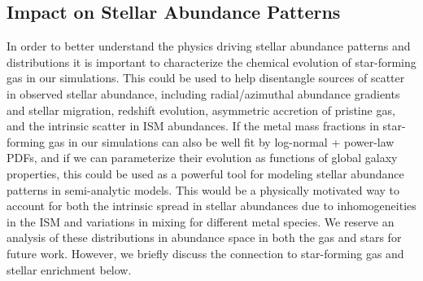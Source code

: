 \documentclass[twocolumn]{aastex61}
\begin{document}


\subsection{Impact on Stellar Abundance Patterns}
\label{sec:stellar abundances}
In order to better understand the physics driving stellar abundance patterns and distributions it is important to characterize the chemical evolution of star-forming gas in our simulations. This could be used to help disentangle sources of scatter in observed stellar abundance, including radial/azimuthal abundance gradients and stellar migration, redshift evolution, asymmetric accretion of pristine gas, and the intrinsic scatter in ISM abundances. If the 
        metal mass fractions in star-forming gas in our simulations 
        can also be well fit by log-normal + power-law PDFs,
and if we can parameterize their evolution as functions of global galaxy properties, this 
    could
be used as a powerful 
tool for modeling stellar abundance patterns in semi-analytic models. This would be a physically motivated way to account for both the intrinsic spread in stellar abundances due to inhomogeneities in the ISM and variations in mixing for different metal species. We reserve an analysis of these distributions in abundance space in both the gas and stars for future work. However, we briefly discuss the connection to star-forming gas and stellar enrichment below.
\end{document}
